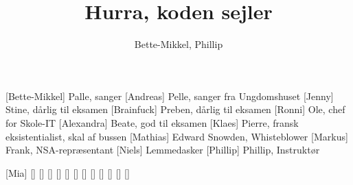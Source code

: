 \documentclass[a4paper,11pt]{article}
\title{Hurra, koden sejler}
\author{Bette-Mikkel, Phillip}
\begin{document}
\maketitle

\begin{roles}
[Bette-Mikkel] Palle, sanger
[Andreas] Pelle, sanger fra Ungdomshuset
[Jenny] Stine, dårlig til eksamen
[Brainfuck] Preben, dårlig til eksamen
[Ronni] Ole, chef for Skole-IT
[Alexandra] Beate, god til eksamen
[Klaes] Pierre, fransk eksistentialist, skal af bussen
[Mathias] Edward Snowden, Whisteblower
[Markus] Frank, NSA-repræsentant
[Niels] Lemmedasker
[Phillip] Phillip, Instruktør
\end{roles}

\begin{props}
[Mia]
[]
[]
[]
[]
[]
[]
[]
[]
[]
[]
[]
[]

\end{props}
\end{document}
